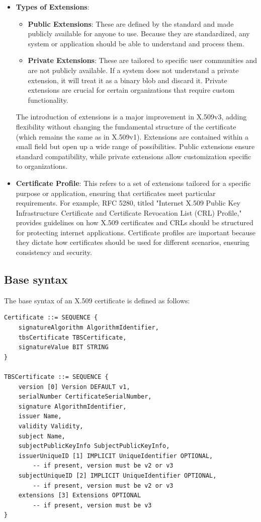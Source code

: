 \begin{itemize}
  \item \textbf{Types of Extensions}:
    \begin{itemize}
      \item \textbf{Public Extensions}: These are defined by the
        standard and made publicly available for anyone to use.
        Because they are standardized, any system or application
        should be able to understand and process them.
      \item \textbf{Private Extensions}: These are tailored to
        specific user communities and are not publicly available. If a
        system does not understand a private extension, it will treat
        it as a binary blob and discard it. Private extensions are
        crucial for certain organizations that require custom
        functionality.
    \end{itemize}
    
    The introduction of extensions is a major improvement in X.509v3,
    adding flexibility without changing the fundamental structure of
    the certificate (which remains the same as in X.509v1). Extensions
    are contained within a small field but open up a wide range of
    possibilities. Public extensions ensure standard compatibility,
    while private extensions allow customization specific to
    organizations.

  \item \textbf{Certificate Profile}: This refers to a set of
    extensions tailored for a specific purpose or application,
    ensuring that certificates meet particular requirements. For
    example, RFC 5280, titled "Internet X.509 Public Key
    Infrastructure Certificate and Certificate Revocation List (CRL)
    Profile," provides guidelines on how X.509 certificates and CRLs
    should be structured for protecting internet applications.
    Certificate profiles are important because they dictate how
    certificates should be used for different scenarios, ensuring
    consistency and security.
\end{itemize}


\subsection{Base syntax}

The base syntax of an X.509 certificate is defined as follows:

\begin{verbatim}
Certificate ::= SEQUENCE {
    signatureAlgorithm AlgorithmIdentifier,
    tbsCertificate TBSCertificate,
    signatureValue BIT STRING
}

TBSCertificate ::= SEQUENCE {
    version [0] Version DEFAULT v1,
    serialNumber CertificateSerialNumber,
    signature AlgorithmIdentifier,
    issuer Name,
    validity Validity,
    subject Name,
    subjectPublicKeyInfo SubjectPublicKeyInfo,
    issuerUniqueID [1] IMPLICIT UniqueIdentifier OPTIONAL,
        -- if present, version must be v2 or v3
    subjectUniqueID [2] IMPLICIT UniqueIdentifier OPTIONAL,
        -- if present, version must be v2 or v3
    extensions [3] Extensions OPTIONAL
        -- if present, version must be v3
}
\end{verbatim}

